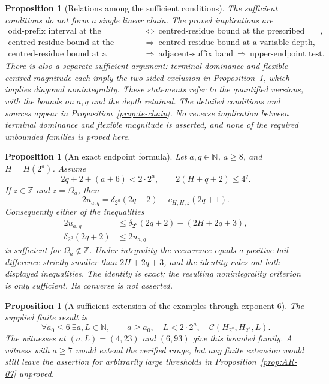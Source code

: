 \documentclass[11pt]{article}
\theoremstyle{plain}
\newtheorem{prop}[thm]{Proposition}
\theoremstyle{definition}
\theoremstyle{remark}
\begin{document}
\begin{prop}[Relations among the sufficient conditions]\label{prop:TE-05}
The sufficient conditions do not form a single linear chain. The proved
implications are
\[
 \begin{aligned}
 \text{odd-prefix interval at the prescribed depth}
 &\ \Longleftrightarrow\ \text{centred-residue bound at the prescribed depth},\\
 \text{centred-residue bound at the prescribed depth}
 &\ \Longrightarrow\ \text{centred-residue bound at a variable depth},\\
 \text{centred-residue bound at a variable depth}
 &\ \Longrightarrow\ \text{adjacent-suffix band}
   \ \Longrightarrow\ \text{upper-endpoint test}.
 \end{aligned}
\]
There is also a separate sufficient argument: terminal dominance and
flexible centred magnitude each imply the two-sided exclusion in
Proposition~\ref{prop:TE-06}, which implies diagonal nonintegrality.
These statements refer to the quantified versions, with the bounds on
$a,q$ and the depth retained. The detailed conditions and sources appear
in Proposition~\ref{prop:te-chain}. No reverse implication between
terminal dominance and flexible magnitude is asserted, and none of the
required unbounded families is proved here.
\end{prop}

\begin{prop}[An exact endpoint formula]\label{prop:TE-06}
Let $a,q\in\mathbb N$, $a\ge8$, and $H=H(2^a)$. Assume
\[
 2q+2+(a+6)<2\cdot2^a,\qquad 2(H+q+2)\le4^q.
\]
If $z\in\mathbb Z$ and $z=\Omega_a$, then
\[
 2u_{a,q}=\delta_{2^a}(2q+2)-c_{H,H,z}(2q+1).
\]
Consequently either of the inequalities
\[
 \begin{aligned}
 2u_{a,q}&\le\delta_{2^a}(2q+2)-(2H+2q+3),\\
 \delta_{2^a}(2q+2)&\le2u_{a,q}
 \end{aligned}
\]
is sufficient for $\Omega_a\notin\mathbb Z$. Under integrality the
recurrence equals a positive tail difference strictly smaller than
$2H+2q+3$, and the identity rules out both displayed inequalities.
The identity is exact; the resulting nonintegrality criterion is only
sufficient. Its converse is not asserted.
\end{prop}

\begin{prop}[A sufficient extension of the examples through exponent 6]\label{prop:SK-02}
The supplied finite result is
\[
 \forall a_0\le6\ \exists a,L\in\mathbb N,\qquad
 a\ge a_0,\quad L<2\cdot2^a,\quad
 \mathcal C(H_{2^a},H_{2^a},L).
\]
The witnesses at $(a,L)=(4,23)$ and $(6,93)$ give this bounded family.
A witness with $a\ge7$ would extend the verified range, but any finite
extension would still leave the assertion for arbitrarily large
thresholds in Proposition~\ref{prop:AR-07} unproved.

\end{prop}
\end{document}
